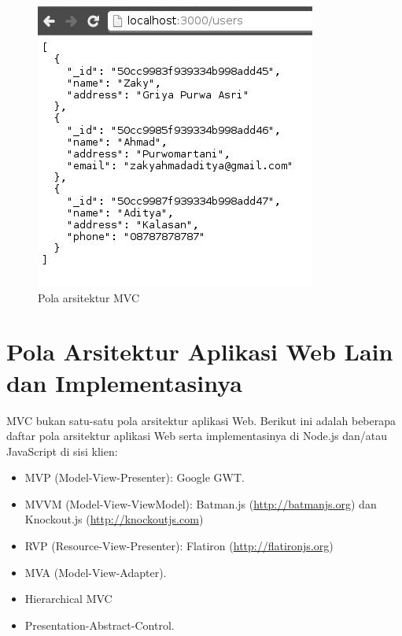  \begin{figure}
    \begin{center}
      \includegraphics[scale=0.5]{images/mvc-result.jpg}
    \end{center}
    \caption{Pola arsitektur MVC}
    \label{fig:hasil-mvc}
  \end{figure}

\section{Pola Arsitektur Aplikasi Web Lain dan Implementasinya}

MVC bukan satu-satu pola arsitektur aplikasi Web. Berikut ini adalah beberapa daftar pola arsitektur aplikasi Web serta implementasinya di Node.js dan/atau JavaScript di sisi klien:
\begin{itemize}
\item MVP (Model-View-Presenter): Google GWT.
\item MVVM (Model-View-ViewModel): Batman.js (\url{http://batmanjs.org}) dan Knockout.js (\url{http://knockoutjs.com})
\item RVP (Resource-View-Presenter): Flatiron (\url{http://flatironjs.org})
\item MVA (Model-View-Adapter).
\item Hierarchical MVC
\item Presentation-Abstract-Control.
\end{itemize}
